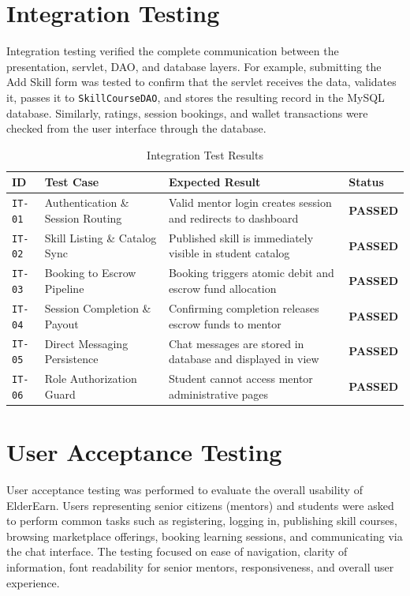 \documentclass[12pt,a4paper]{report}
\begin{document}
\section{Integration Testing}
Integration testing verified the complete communication between the presentation, servlet, DAO, and database layers. For example, submitting the Add Skill form was tested to confirm that the servlet receives the data, validates it, passes it to \texttt{SkillCourseDAO}, and stores the resulting record in the MySQL database. Similarly, ratings, session bookings, and wallet transactions were checked from the user interface through the database.

\begin{table}[H]
\centering
\small
\caption{Integration Test Results}
\label{tab:integration_test_results}
\begin{tabularx}{\textwidth}{|L{1.8cm}|L{4.2cm}|J|C{2.0cm}|}
\hline
\textbf{ID} & \textbf{Test Case} & \textbf{Expected Result} & \textbf{Status} \\ \hline
\texttt{IT-01} & Authentication \& Session Routing & Valid mentor login creates session and redirects to dashboard & \textbf{PASSED} \\ \hline
\texttt{IT-02} & Skill Listing \& Catalog Sync & Published skill is immediately visible in student catalog & \textbf{PASSED} \\ \hline
\texttt{IT-03} & Booking to Escrow Pipeline & Booking triggers atomic debit and escrow fund allocation & \textbf{PASSED} \\ \hline
\texttt{IT-04} & Session Completion \& Payout & Confirming completion releases escrow funds to mentor & \textbf{PASSED} \\ \hline
\texttt{IT-05} & Direct Messaging Persistence & Chat messages are stored in database and displayed in view & \textbf{PASSED} \\ \hline
\texttt{IT-06} & Role Authorization Guard & Student cannot access mentor administrative pages & \textbf{PASSED} \\ \hline
\end{tabularx}
\end{table}

\section{User Acceptance Testing}
User acceptance testing was performed to evaluate the overall usability of ElderEarn. Users representing senior citizens (mentors) and students were asked to perform common tasks such as registering, logging in, publishing skill courses, browsing marketplace offerings, booking learning sessions, and communicating via the chat interface. The testing focused on ease of navigation, clarity of information, font readability for senior mentors, responsiveness, and overall user experience.
\end{document}
